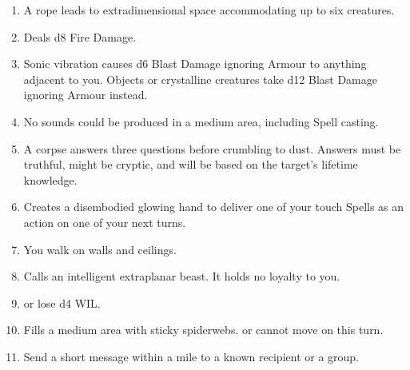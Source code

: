 \documentclass[itdr/core]{subfiles}
\begin{document}
\begin{enumerate}
	\item {} A rope leads to extradimensional space accommodating up to six creatures.
	\item {} Deals d8 Fire Damage.
	\item {} Sonic vibration causes d6 Blast Damage ignoring Armour to anything adjacent to you. Objects or crystalline creatures take d12 Blast Damage ignoring Armour instead.
	\item {} No sounds could be produced in a medium area, including Spell casting.
	\item {} A corpse answers three questions before crumbling to dust. Answers must be truthful, might be cryptic, and will be based on the target's lifetime knowledge.
	\item {} Creates a disembodied glowing hand to deliver one of your touch Spells as an action on one of your next turns.
	\item {} You walk on walls and ceilings.
	\item {} Calls an intelligent extraplanar beast. It holds no loyalty to you.
	\item {}  or lose d4 WIL.
	\item {} Fills a medium area with sticky spiderwebs.  or cannot move on this turn.
	\item {} Send a short message within a mile to a known recipient or a group.
\end{enumerate}

\vfill
\break
\end{document}
